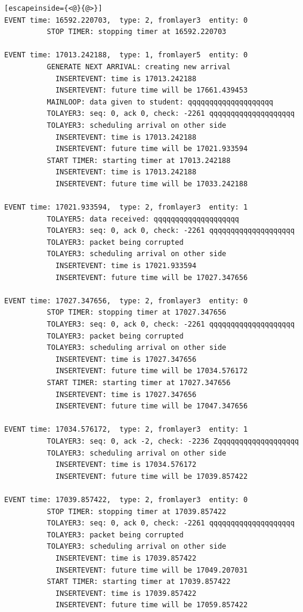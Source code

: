\documentclass[paper=a4, fontsize=11pt]{scrartcl}
\numberwithin{equation}{section}		%
\numberwithin{figure}{section}			%
\numberwithin{table}{section}				%
\begin{document}
\begin{lstlisting}[escapeinside={<@}{@>}]
EVENT time: 16592.220703,  type: 2, fromlayer3  entity: 0
          STOP TIMER: stopping timer at 16592.220703

EVENT time: 17013.242188,  type: 1, fromlayer5  entity: 0
          GENERATE NEXT ARRIVAL: creating new arrival
            INSERTEVENT: time is 17013.242188
            INSERTEVENT: future time will be 17661.439453
          MAINLOOP: data given to student: qqqqqqqqqqqqqqqqqqqq
          TOLAYER3: seq: 0, ack 0, check: -2261 qqqqqqqqqqqqqqqqqqqq
          TOLAYER3: scheduling arrival on other side
            INSERTEVENT: time is 17013.242188
            INSERTEVENT: future time will be 17021.933594
          START TIMER: starting timer at 17013.242188
            INSERTEVENT: time is 17013.242188
            INSERTEVENT: future time will be 17033.242188

EVENT time: 17021.933594,  type: 2, fromlayer3  entity: 1
          TOLAYER5: data received: qqqqqqqqqqqqqqqqqqqq
          TOLAYER3: seq: 0, ack 0, check: -2261 qqqqqqqqqqqqqqqqqqqq
          TOLAYER3: packet being corrupted
          TOLAYER3: scheduling arrival on other side
            INSERTEVENT: time is 17021.933594
            INSERTEVENT: future time will be 17027.347656

EVENT time: 17027.347656,  type: 2, fromlayer3  entity: 0
          STOP TIMER: stopping timer at 17027.347656
          TOLAYER3: seq: 0, ack 0, check: -2261 qqqqqqqqqqqqqqqqqqqq
          TOLAYER3: packet being corrupted
          TOLAYER3: scheduling arrival on other side
            INSERTEVENT: time is 17027.347656
            INSERTEVENT: future time will be 17034.576172
          START TIMER: starting timer at 17027.347656
            INSERTEVENT: time is 17027.347656
            INSERTEVENT: future time will be 17047.347656

EVENT time: 17034.576172,  type: 2, fromlayer3  entity: 1
          TOLAYER3: seq: 0, ack -2, check: -2236 Zqqqqqqqqqqqqqqqqqqq
          TOLAYER3: scheduling arrival on other side
            INSERTEVENT: time is 17034.576172
            INSERTEVENT: future time will be 17039.857422

EVENT time: 17039.857422,  type: 2, fromlayer3  entity: 0
          STOP TIMER: stopping timer at 17039.857422
          TOLAYER3: seq: 0, ack 0, check: -2261 qqqqqqqqqqqqqqqqqqqq
          TOLAYER3: packet being corrupted
          TOLAYER3: scheduling arrival on other side
            INSERTEVENT: time is 17039.857422
            INSERTEVENT: future time will be 17049.207031
          START TIMER: starting timer at 17039.857422
            INSERTEVENT: time is 17039.857422
            INSERTEVENT: future time will be 17059.857422


\end{lstlisting}
\end{document}
